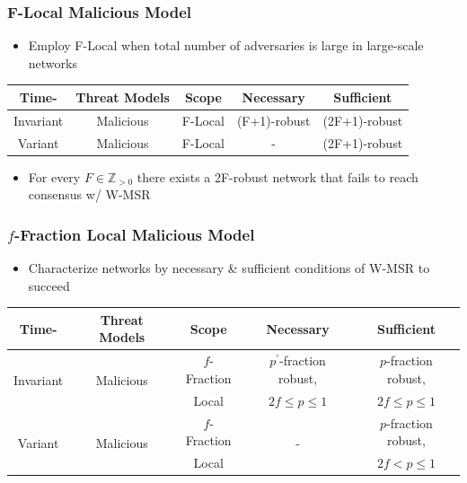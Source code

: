 \documentclass{beamer}
\begin{document}
\begin{frame}
\frametitle{F-Local Malicious Model}
\begin{itemize}
\item Employ F-Local when total number of adversaries is large in large-scale networks
\end{itemize}
\begin{table}
\centering
\begin{tabular}{|c|c|c|c|c|}
\hline \scriptsize{\textbf{Time-}} &\scriptsize{\textbf{Threat Models}} &  \scriptsize{\textbf{Scope}} & \scriptsize{\textbf{Necessary}} & \scriptsize{\textbf{Sufficient}} \\
\hline \scriptsize{Invariant} &\scriptsize{Malicious} & \scriptsize{F-Local}  & \scriptsize{(F+1)-robust} & \scriptsize{(2F+1)-robust} \\
\hline \scriptsize{Variant} &\scriptsize{Malicious} & \scriptsize{F-Local}  & \scriptsize{-} & \scriptsize{(2F+1)-robust}  \\
\hline
\end{tabular}
\end{table}
\begin{itemize}
\item For every $F \in \mathbb{Z}_{>0}$ there exists a 2F-robust network that fails to reach consensus w/ W-MSR
\end{itemize}
\end{frame}

\begin{frame}
\frametitle{$f$-Fraction Local Malicious Model}
\begin{itemize}
\item Characterize networks by necessary \& sufficient conditions of W-MSR to succeed
\end{itemize}
\begin{table}
\centering
\begin{tabular}{|c|c|c|c|c|}
\hline \scriptsize{\textbf{Time-}} &\scriptsize{\textbf{Threat Models}} &  \scriptsize{\textbf{Scope}} & \scriptsize{\textbf{Necessary}} & \scriptsize{\textbf{Sufficient}} \\
\hline \multirow{2}{*}{\scriptsize{Invariant}} & \multirow{2}{*}{\scriptsize{Malicious}} & \scriptsize{$f$-Fraction}  & \scriptsize{$p^{\prime}$-fraction robust,} & \scriptsize{$p$-fraction robust, } \\
& & \scriptsize{Local}  & \scriptsize{$2f\leq p\leq 1$} & \scriptsize{ $2f\leq p\leq 1$}\\ 
\hline \multirow{2}{*}{\scriptsize{Variant}} & \multirow{2}{*}{\scriptsize{Malicious}} & \scriptsize{$f$-Fraction}  & \multirow{2}{*}{\scriptsize{-}} & \scriptsize{$p$-fraction robust, } \\
& & \scriptsize{Local}  &  & \scriptsize{$2f< p\leq 1$}\\
\hline
\end{tabular}
\end{table}

\end{frame}
\end{document}
